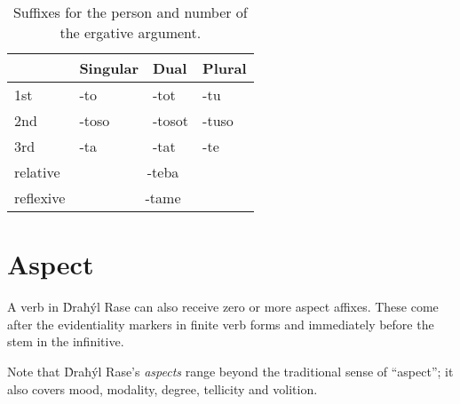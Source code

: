 \documentclass{book}
\begin{document}
\begin{table}[htbp]
    \caption{Suffixes for the person and number of the ergative argument.}
    \centering
    \begin{tabular}{|l|l|l|l|}
        \hline
        & Singular & Dual & Plural \\
        \hline
        1st & -to & -tot & -tu \\
        2nd & -toso & -tosot & -tuso \\
        3rd & -ta & -tat & -te \\
        \hline
        relative & \multicolumn{3}{c|}{-teba} \\
        reflexive & \multicolumn{3}{c|}{-tame} \\
        \hline
    \end{tabular}
\end{table}

\section{Aspect}

A verb in Ḋraħýl Rase can also receive zero or more aspect affixes. These come after the evidentiality markers in finite verb forms and immediately before the stem in the infinitive.

Note that Ḋraħýl Rase's \emph{aspects} range beyond the traditional sense of ``aspect''; it also covers mood, modality, degree, tellicity and volition.
\end{document}
